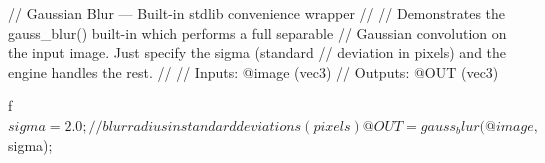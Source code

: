 // Gaussian Blur — Built-in stdlib convenience wrapper
//
// Demonstrates the gauss_blur() built-in which performs a full separable
// Gaussian convolution on the input image. Just specify the sigma (standard
// deviation in pixels) and the engine handles the rest.
//
// Inputs:  @image (vec3)
// Outputs: @OUT   (vec3)

f$sigma = 2.0;   // blur radius in standard deviations (pixels)

@OUT = gauss_blur(@image, $sigma);
